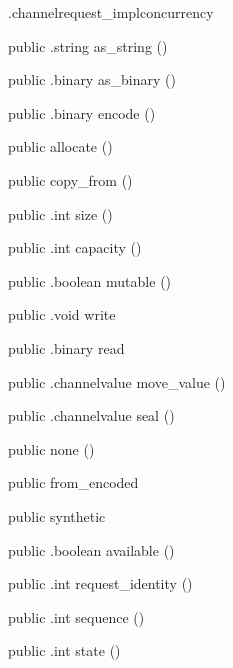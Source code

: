 \begin{CrexxClass}{.channelrequest\_impl}{concurrency}
\begin{Members}
    \Method
      {public}
      {.string}
      {as\_string}
      {()}

    \Method
      {public}
      {.binary}
      {as\_binary}
      {()}

    \Method
      {public}
      {.binary}
      {encode}
      {()}

    \Factory
      {public}
      {allocate}
      {()}

    \Factory
      {public}
      {copy\_from}
      {()}

    \Method
      {public}
      {.int}
      {size}
      {()}

    \Method
      {public}
      {.int}
      {capacity}
      {()}

    \Method
      {public}
      {.boolean}
      {mutable}
      {()}

    \Method
      {public}
      {.void}
      {write}
      {}

    \Method
      {public}
      {.binary}
      {read}
      {}

    \Method
      {public}
      {.channelvalue}
      {move\_value}
      {()}

    \Method
      {public}
      {.channelvalue}
      {seal}
      {()}

    \Factory
      {public}
      {none}
      {()}

    \Factory
      {public}
      {from\_encoded}
      {}

    \Factory
      {public}
      {synthetic}
      {}

    \Method
      {public}
      {.boolean}
      {available}
      {()}

    \Method
      {public}
      {.int}
      {request\_identity}
      {()}

    \Method
      {public}
      {.int}
      {sequence}
      {()}

    \Method
      {public}
      {.int}
      {state}
      {()}


\end{Members}
\end{CrexxClass}
